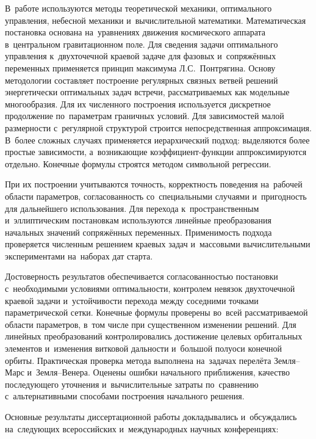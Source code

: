 В~работе используются методы теоретической механики, оптимального управления, небесной механики и~вычислительной математики. Математическая постановка основана на~уравнениях движения космического аппарата в~центральном гравитационном поле. Для сведения задачи оптимального управления к~двухточечной краевой задаче для фазовых и~сопряжённых переменных применяется принцип максимума Л.С.~Понтрягина. Основу методологии составляет построение регулярных связных ветвей решений энергетически оптимальных задач встречи, рассматриваемых как модельные многообразия. Для их численного построения используется дискретное продолжение по~параметрам граничных условий. Для зависимостей малой размерности с~регулярной структурой строится непосредственная аппроксимация. В~более сложных случаях применяется иерархический подход: выделяются более простые зависимости, а~возникающие коэффициент-функции аппроксимируются отдельно. Конечные формулы строятся методом символьной регрессии.\par{}\noindent При их построении учитываются точность, корректность поведения на~рабочей области параметров, согласованность со~специальными случаями и~пригодность для дальнейшего использования. Для перехода к~пространственным и~эллиптическим постановкам используются линейные преобразования начальных значений сопряжённых переменных. Применимость подхода проверяется численным решением краевых задач и~массовыми вычислительными экспериментами на~наборах дат старта.

Достоверность результатов обеспечивается согласованностью постановки с~необходимыми условиями оптимальности, контролем невязок двухточечной краевой задачи и~устойчивости перехода между соседними точками параметрической сетки. Конечные формулы проверены во~всей рассматриваемой области параметров, в~том числе при существенном изменении решений. Для линейных преобразований контролировались достижение целевых орбитальных элементов и~изменения витковой дальности и~большой полуоси конечной орбиты. Практическая проверка метода выполнена на~задачах перелёта Земля--Марс и~Земля--Венера. Оценены ошибки начального приближения, качество последующего уточнения и~вычислительные затраты по~сравнению с~альтернативными способами построения начального решения.

Основные результаты диссертационной работы докладывались и~обсуждались на~следующих всероссийских и~международных научных конференциях:

